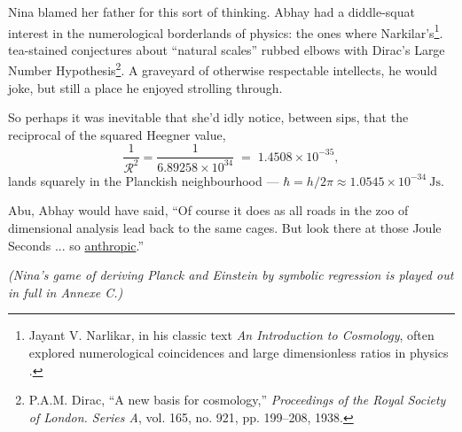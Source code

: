 Nina blamed her father for this sort of thinking. Abhay had a diddle-squat interest in the numerological borderlands of physics: the ones where Narkilar’s\footnote{Jayant V. Narlikar, in his classic text \emph{An Introduction to Cosmology}, often explored numerological coincidences and large dimensionless ratios in physics \cite{narlikar2002}.}.
 tea-stained conjectures about “natural scales” rubbed elbows with Dirac’s Large Number Hypothesis\footnote{P.A.M. Dirac, ``A new basis for cosmology,'' \emph{Proceedings of the Royal Society of London. Series A}, vol. 165, no. 921, pp. 199–208, 1938.}. A graveyard of otherwise respectable intellects, he would joke, but still a place he enjoyed strolling through. 

\medskip

\noindent So perhaps it was inevitable that she’d idly notice, between sips, that the reciprocal of the squared Heegner value,
\[
\frac{1}{\mathcal{R}^2} = \frac{1}{6.89258\times 10^{34}} \;=\; 1.4508\times 10^{-35},
\]
lands squarely in the Planckish neighbourhood — \(\hbar = h/2\pi \approx 1.0545\times 10^{-34}\ \mathrm{Js}\).

Abu, Abhay would have said, “Of course it does as all roads in the zoo of dimensional analysis lead back to the same cages. But look there at those Joule Seconds ... so \href{https://www.researchgate.net/publication/390318980_Redefining_Planck's_Constant_via_Cosmological_Time_Ramanujan_Time_and_the_Wien_Displacement_Field}{anthropic}.” 

\textit{(Nina's game of deriving Planck and Einstein by symbolic regression is played out in full in Annexe C.)}

